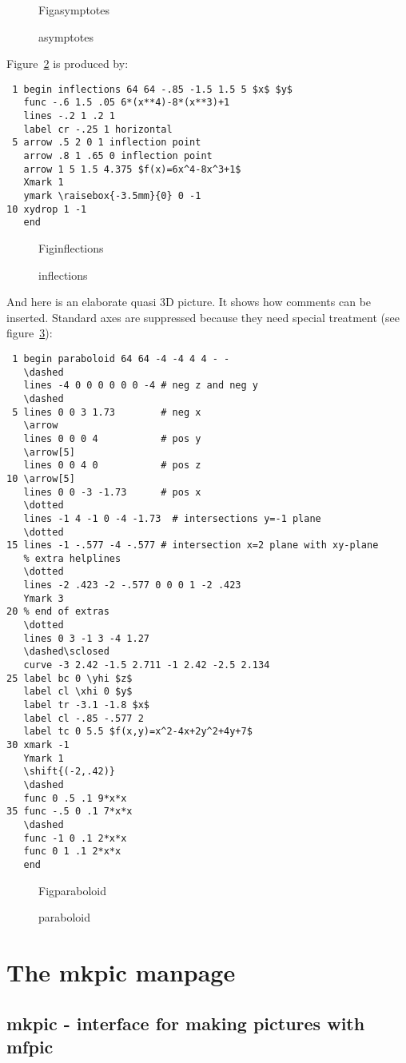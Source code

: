 \documentclass[a4paper,twocolumn]{article}
\newcommand{\makefigure}[1]{
  \vspace{2ex}
  \begin{figure}[htb]
    \begin{center}
      \mbox{\quad\csname Fig#1\endcsname}
      \caption{#1}
      \label{fig:#1}
    \end{center}
  \end{figure}
}
\begin{document}
\makefigure{asymptotes}

Figure~\ref{fig:inflections} is produced by:

\footnotesize
\begin{verbatim}
 1 begin inflections 64 64 -.85 -1.5 1.5 5 $x$ $y$
   func -.6 1.5 .05 6*(x**4)-8*(x**3)+1
   lines -.2 1 .2 1
   label cr -.25 1 horizontal
 5 arrow .5 2 0 1 inflection point
   arrow .8 1 .65 0 inflection point
   arrow 1 5 1.5 4.375 $f(x)=6x^4-8x^3+1$
   Xmark 1
   ymark \raisebox{-3.5mm}{0} 0 -1
10 xydrop 1 -1
   end
\end{verbatim}
\normalsize

\makefigure{inflections}

And here is an elaborate quasi 3D picture.
It shows how comments can be inserted.
Standard axes are suppressed because they need special treatment (see figure~\ref{fig:paraboloid}):

\footnotesize
\begin{verbatim}
 1 begin paraboloid 64 64 -4 -4 4 4 - -
   \dashed
   lines -4 0 0 0 0 0 0 -4 # neg z and neg y
   \dashed
 5 lines 0 0 3 1.73        # neg x
   \arrow
   lines 0 0 0 4           # pos y
   \arrow[5]
   lines 0 0 4 0           # pos z
10 \arrow[5]
   lines 0 0 -3 -1.73      # pos x
   \dotted
   lines -1 4 -1 0 -4 -1.73  # intersections y=-1 plane
   \dotted
15 lines -1 -.577 -4 -.577 # intersection x=2 plane with xy-plane
   % extra helplines
   \dotted
   lines -2 .423 -2 -.577 0 0 0 1 -2 .423
   Ymark 3
20 % end of extras
   \dotted
   lines 0 3 -1 3 -4 1.27
   \dashed\sclosed
   curve -3 2.42 -1.5 2.711 -1 2.42 -2.5 2.134
25 label bc 0 \yhi $z$
   label cl \xhi 0 $y$
   label tr -3.1 -1.8 $x$
   label cl -.85 -.577 2
   label tc 0 5.5 $f(x,y)=x^2-4x+2y^2+4y+7$
30 xmark -1
   Ymark 1
   \shift{(-2,.42)}
   \dashed
   func 0 .5 .1 9*x*x
35 func -.5 0 .1 7*x*x
   \dashed
   func -1 0 .1 2*x*x
   func 0 1 .1 2*x*x
   end
\end{verbatim}
\normalsize
\vspace*{3ex}
\makefigure{paraboloid}

\setcounter{secnumdepth}{1}
\onecolumn
\newpage
\section{The mkpic manpage\label{manpage}}
\small

\subsection{mkpic - interface for making pictures with mfpic}
\end{document}
